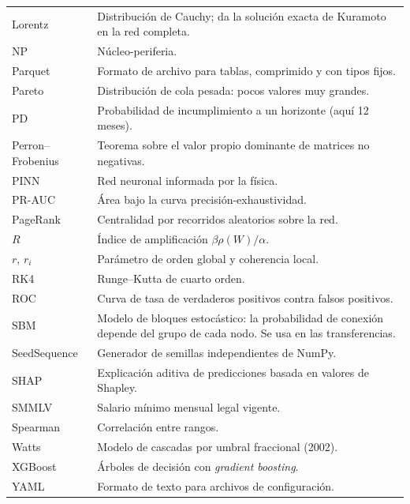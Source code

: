 \begin{longtable}{p{}p{}}
Lorentz & Distribución de Cauchy; da la solución exacta de Kuramoto en la red
completa. \\
NP & Núcleo-periferia. \\
Parquet & Formato de archivo para tablas, comprimido y con tipos fijos. \\
Pareto & Distribución de cola pesada: pocos valores muy grandes. \\
PD & Probabilidad de incumplimiento a un horizonte (aquí 12 meses). \\
Perron–Frobenius & Teorema sobre el valor propio dominante de matrices no negativas. \\
PINN & Red neuronal informada por la física. \\
PR-AUC & Área bajo la curva precisión-exhaustividad. \\
PageRank & Centralidad por recorridos aleatorios sobre la red. \\
$R$ & Índice de amplificación $\beta\rho(W)/\alpha$. \\
$r$, $r_i$ & Parámetro de orden global y coherencia local. \\
RK4 & Runge–Kutta de cuarto orden. \\
ROC & Curva de tasa de verdaderos positivos contra falsos positivos. \\
SBM & Modelo de bloques estocástico: la probabilidad de conexión depende del grupo de
cada nodo. Se usa en las transferencias. \\
SeedSequence & Generador de semillas independientes de NumPy. \\
SHAP & Explicación aditiva de predicciones basada en valores de Shapley. \\
SMMLV & Salario mínimo mensual legal vigente. \\
Spearman & Correlación entre rangos. \\
Watts & Modelo de cascadas por umbral fraccional (2002). \\
XGBoost & Árboles de decisión con \emph{gradient boosting}. \\
YAML & Formato de texto para archivos de configuración. \\
\bottomrule
\end{longtable}
